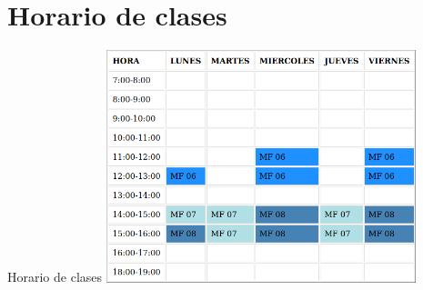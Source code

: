\documentclass [xcolor=svgnames, t] {beamer}
\begin{document}
\section{Horario de clases}
\begin{frame}{Horario de clases}
\centering
\includegraphics[width=9cm]{horarioClases}
\end{frame}
\end{document}
